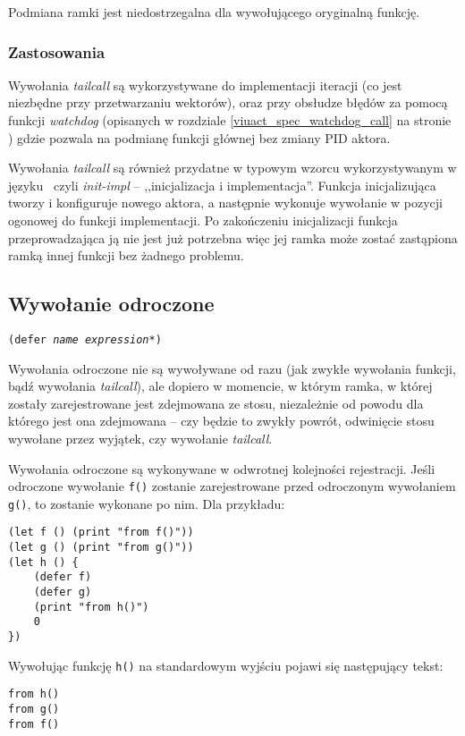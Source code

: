 Podmiana ramki jest niedostrzegalna dla wywołującego oryginalną funkcję.

\subsubsection{Zastosowania}

Wywołania \emph{tailcall} są wykorzystywane do implementacji iteracji (co jest
niezbędne przy przetwarzaniu wektorów), oraz przy obsłudze błędów za pomocą
funkcji \emph{watchdog} (opisanych w rozdziale \ref{viuact_spec_watchdog_call}
na stronie \pageref{viuact_spec_watchdog_call}) gdzie pozwala na podmianę
funkcji głównej bez zmiany PID aktora.

Wywołania \emph{tailcall} są również przydatne w typowym wzorcu wykorzystywanym
w języku \ViuAct\ czyli \emph{init-impl} -- ,,inicjalizacja i implementacja''.
Funkcja inicjalizująca tworzy i konfiguruje nowego aktora, a następnie wykonuje
wywołanie w pozycji ogonowej do funkcji implementacji. Po zakończeniu
inicjalizacji funkcja przeprowadzająca ją nie jest już potrzebna więc jej ramka
może zostać zastąpiona ramką innej funkcji bez żadnego problemu.

\subsection{Wywołanie odroczone}
\label{viuact_spec_deferred_call}

\texttt{(defer \emph{name} \emph{expression}*)}
\newline

Wywołania odroczone nie są wywoływane od razu (jak zwykłe wywołania funkcji, bądź wywołania \emph{tailcall}),
ale dopiero w momencie, w którym ramka, w której zostały zarejestrowane jest zdejmowana ze stosu, niezależnie
od powodu dla którego jest ona zdejmowana -- czy będzie to zwykły powrót, odwinięcie stosu wywołane przez
wyjątek, czy wywołanie \emph{tailcall}.

Wywołania odroczone są wykonywane w odwrotnej kolejności rejestracji. Jeśli odroczone wywołanie \texttt{f()}
zostanie zarejestrowane przed odroczonym wywołaniem \texttt{g()}, to zostanie wykonane po nim. Dla przykładu:
\begin{lstlisting}
(let f () (print "from f()"))
(let g () (print "from g()"))
(let h () {
    (defer f)
    (defer g)
    (print "from h()")
    0
})
\end{lstlisting}

Wywołując funkcję \texttt{h()} na standardowym wyjściu pojawi się następujący tekst:
\begin{lstlisting}
from h()
from g()
from f()
\end{lstlisting}

